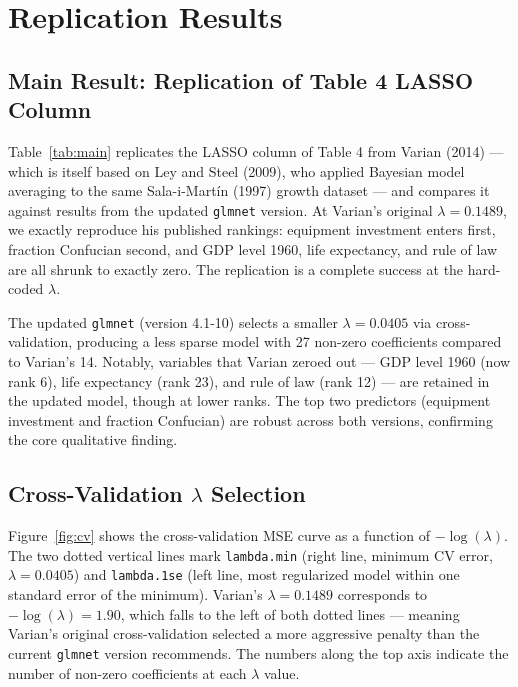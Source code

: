 \documentclass[12pt]{article}
\begin{document}
\section{Replication Results}

\subsection*{Main Result: Replication of Table 4 LASSO Column}

Table~\ref{tab:main} replicates the LASSO column of Table 4 from Varian (2014)
--- which is itself based on Ley and Steel (2009), who applied Bayesian model
averaging to the same Sala-i-Mart\'{i}n (1997) growth dataset --- and compares
it against results from the updated \texttt{glmnet} version. At Varian's
original $\lambda = 0.1489$, we exactly reproduce his published rankings:
equipment investment enters first, fraction Confucian second, and GDP level
1960, life expectancy, and rule of law are all shrunk to exactly zero. The
replication is a complete success at the hard-coded $\lambda$.



The updated \texttt{glmnet} (version 4.1-10) selects a smaller $\lambda =
0.0405$ via cross-validation, producing a less sparse model with 27 non-zero
coefficients compared to Varian's 14. Notably, variables that Varian zeroed
out --- GDP level 1960 (now rank 6), life expectancy (rank 23), and rule of law
(rank 12) --- are retained in the updated model, though at lower ranks. The
top two predictors (equipment investment and fraction Confucian) are robust
across both versions, confirming the core qualitative finding.

\subsection*{Cross-Validation $\lambda$ Selection}

Figure~\ref{fig:cv} shows the cross-validation MSE curve as a function of
$-\log(\lambda)$. The two dotted vertical lines mark \texttt{lambda.min} (right
line, minimum CV error, $\lambda = 0.0405$) and \texttt{lambda.1se} (left line,
most regularized model within one standard error of the minimum). Varian's
$\lambda = 0.1489$ corresponds to $-\log(\lambda) = 1.90$, which falls to the
left of both dotted lines --- meaning Varian's original cross-validation selected
a more aggressive penalty than the current \texttt{glmnet} version recommends.
The numbers along the top axis indicate the number of non-zero coefficients at
each $\lambda$ value.
\end{document}
